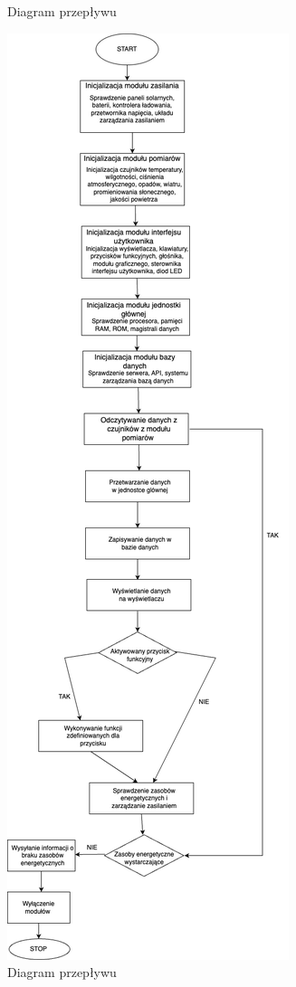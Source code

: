 \documentclass{article}
\begin{document}
\begin{figure}
    \centering
    \begin{minipage}{0.6\textwidth}
        \centering
        \large Diagram przepływu
    \end{minipage}
    \begin{center}
        \includegraphics[scale=0.35]{4.1.2.png}
    \end{center}
    \caption{Diagram przepływu}
    \label{etykieta14}
\end{figure}
\end{document}
